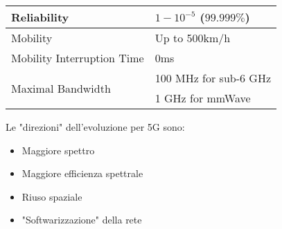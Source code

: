 \begin{center}
{\begin{tabular}{l | l}
			Reliability & $1-10^{-5}$ ($99.999\%$) \\
			\hline
			
			Mobility & Up to 500km/h \\
			\hline
			
			Mobility Interruption Time & 0ms \\
			\hline
			
			\multirow{2}{*}{Maximal Bandwidth} & 100 MHz for sub-6 GHz \\
			\cline{2-2}
			& 1 GHz for mmWave \\
			\hline
	\end{tabular}}
\end{center}

Le "direzioni" dell'evoluzione per 5G sono: 
\begin{itemize}
	\item Maggiore spettro
	\item Maggiore efficienza spettrale
	\item Riuso spaziale
	\item "Softwarizzazione" della rete
\end{itemize}

